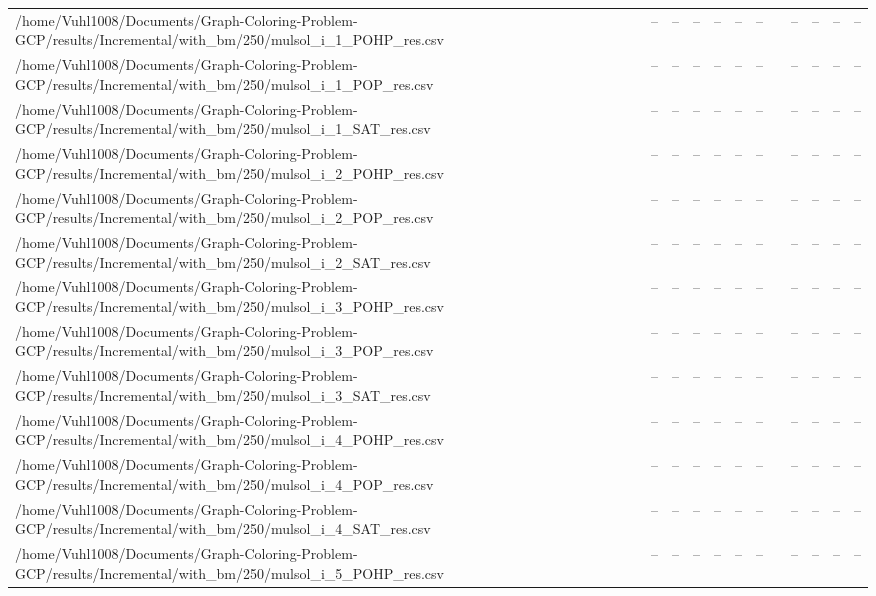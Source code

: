\begin{table}[htbp]
\begin{tabular}{llllllllllll}
/home/Vuhl1008/Documents/Graph-Coloring-Problem-GCP/results/Incremental/with\_bm/250/mulsol\_i\_1\_POHP\_res.csv & -- & -- & -- & -- & -- & -- & {} & -- & -- & -- & -- \\
/home/Vuhl1008/Documents/Graph-Coloring-Problem-GCP/results/Incremental/with\_bm/250/mulsol\_i\_1\_POP\_res.csv & -- & -- & -- & -- & -- & -- & {} & -- & -- & -- & -- \\
/home/Vuhl1008/Documents/Graph-Coloring-Problem-GCP/results/Incremental/with\_bm/250/mulsol\_i\_1\_SAT\_res.csv & -- & -- & -- & -- & -- & -- & {} & -- & -- & -- & -- \\
/home/Vuhl1008/Documents/Graph-Coloring-Problem-GCP/results/Incremental/with\_bm/250/mulsol\_i\_2\_POHP\_res.csv & -- & -- & -- & -- & -- & -- & {} & -- & -- & -- & -- \\
/home/Vuhl1008/Documents/Graph-Coloring-Problem-GCP/results/Incremental/with\_bm/250/mulsol\_i\_2\_POP\_res.csv & -- & -- & -- & -- & -- & -- & {} & -- & -- & -- & -- \\
/home/Vuhl1008/Documents/Graph-Coloring-Problem-GCP/results/Incremental/with\_bm/250/mulsol\_i\_2\_SAT\_res.csv & -- & -- & -- & -- & -- & -- & {} & -- & -- & -- & -- \\
/home/Vuhl1008/Documents/Graph-Coloring-Problem-GCP/results/Incremental/with\_bm/250/mulsol\_i\_3\_POHP\_res.csv & -- & -- & -- & -- & -- & -- & {} & -- & -- & -- & -- \\
/home/Vuhl1008/Documents/Graph-Coloring-Problem-GCP/results/Incremental/with\_bm/250/mulsol\_i\_3\_POP\_res.csv & -- & -- & -- & -- & -- & -- & {} & -- & -- & -- & -- \\
/home/Vuhl1008/Documents/Graph-Coloring-Problem-GCP/results/Incremental/with\_bm/250/mulsol\_i\_3\_SAT\_res.csv & -- & -- & -- & -- & -- & -- & {} & -- & -- & -- & -- \\
/home/Vuhl1008/Documents/Graph-Coloring-Problem-GCP/results/Incremental/with\_bm/250/mulsol\_i\_4\_POHP\_res.csv & -- & -- & -- & -- & -- & -- & {} & -- & -- & -- & -- \\
/home/Vuhl1008/Documents/Graph-Coloring-Problem-GCP/results/Incremental/with\_bm/250/mulsol\_i\_4\_POP\_res.csv & -- & -- & -- & -- & -- & -- & {} & -- & -- & -- & -- \\
/home/Vuhl1008/Documents/Graph-Coloring-Problem-GCP/results/Incremental/with\_bm/250/mulsol\_i\_4\_SAT\_res.csv & -- & -- & -- & -- & -- & -- & {} & -- & -- & -- & -- \\
/home/Vuhl1008/Documents/Graph-Coloring-Problem-GCP/results/Incremental/with\_bm/250/mulsol\_i\_5\_POHP\_res.csv & -- & -- & -- & -- & -- & -- & {} & -- & -- & -- & -- \\

\end{tabular}
\end{table}
